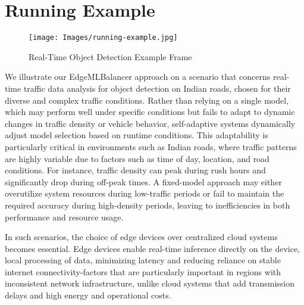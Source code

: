 \section{Running Example}

\begin{figure}
    \centering
    \texttt{[image: Images/running-example.jpg]}
    \caption{Real-Time Object Detection Example Frame}
    \label{fig:running-example}
\end{figure}

We illustrate our EdgeMLBalancer approach on a scenario that concerns real-time traffic data analysis for object detection on Indian roads, chosen for their diverse and complex traffic conditions. 
Rather than relying on a single model, which may perform well under specific conditions but fails to adapt to dynamic changes in traffic density or vehicle behavior, self-adaptive systems dynamically adjust model selection based on runtime conditions. This adaptability is particularly critical in environments such as Indian roads, where traffic patterns are highly variable due to factors such as time of day, location, and road conditions. For instance, traffic density can peak during rush hours and significantly drop during off-peak times. A fixed-model approach may either overutilize system resources during low-traffic periods or fail to maintain the required accuracy during high-density periods, leaving to inefficiencies in both performance and resource usage.

In such scenarios, the choice of edge devices over centralized cloud systems becomes essential. Edge devices enable real-time inference directly on the device, local processing of data, minimizing latency and reducing reliance on stable internet connectivity-factors that are particularly important in regions with inconsistent network infrastructure, unlike cloud systems that add transmission delays and high energy and operational costs. 


